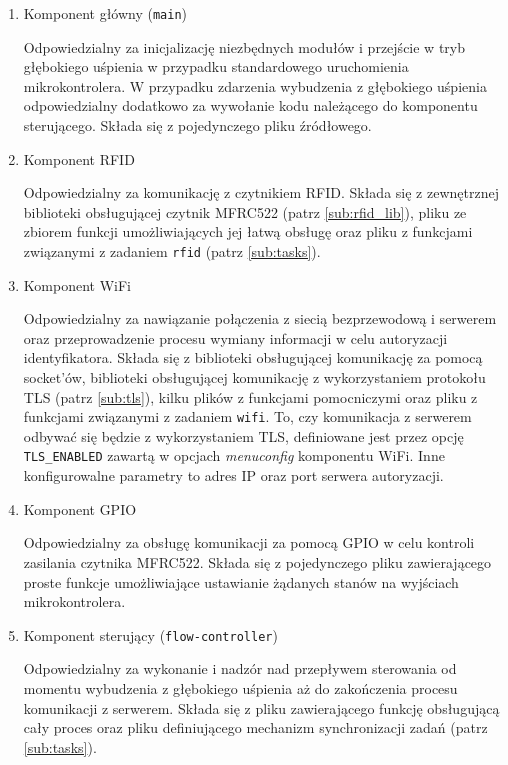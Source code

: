             \begin{enumerate}
                \item Komponent główny (\texttt{main})

                    Odpowiedzialny za inicjalizację niezbędnych modułów i przejście w tryb głębokiego uśpienia w przypadku standardowego uruchomienia mikrokontrolera. W przypadku zdarzenia wybudzenia z głębokiego uśpienia odpowiedzialny dodatkowo za wywołanie kodu należącego do komponentu sterującego. Składa się z pojedynczego pliku źródłowego.

                \item Komponent RFID

                    Odpowiedzialny za komunikację z czytnikiem RFID. Składa się z zewnętrznej biblioteki obsługującej czytnik MFRC522 (patrz \ref{sub:rfid_lib}), pliku ze zbiorem funkcji umożliwiających jej łatwą obsługę oraz pliku z funkcjami związanymi z zadaniem \texttt{rfid} (patrz \ref{sub:tasks}).

                \item Komponent WiFi

                    Odpowiedzialny za nawiązanie połączenia z siecią bezprzewodową i serwerem oraz przeprowadzenie procesu wymiany informacji w celu autoryzacji identyfikatora. Składa się z biblioteki obsługującej komunikację za pomocą socket'ów, biblioteki obsługującej komunikację z wykorzystaniem protokołu TLS (patrz \ref{sub:tls}), kilku plików z funkcjami pomocniczymi oraz pliku z funkcjami związanymi z zadaniem \texttt{wifi}. To, czy komunikacja z serwerem odbywać się będzie z wykorzystaniem TLS, definiowane jest przez opcję \texttt{TLS\_ENABLED} zawartą w opcjach \textit{menuconfig} komponentu WiFi. Inne konfigurowalne parametry to adres IP oraz port serwera autoryzacji.

                \item Komponent GPIO

                    Odpowiedzialny za obsługę komunikacji za pomocą GPIO w celu kontroli zasilania czytnika MFRC522. Składa się z pojedynczego pliku zawierającego proste funkcje umożliwiające ustawianie żądanych stanów na wyjściach mikrokontrolera.

                \item Komponent sterujący (\texttt{flow-controller})

                    Odpowiedzialny za wykonanie i nadzór nad przepływem sterowania od momentu wybudzenia z głębokiego uśpienia aż do zakończenia procesu komunikacji z serwerem. Składa się z pliku zawierającego funkcję obsługującą cały proces oraz pliku definiującego mechanizm synchronizacji zadań (patrz \ref{sub:tasks}).

            \end{enumerate}

